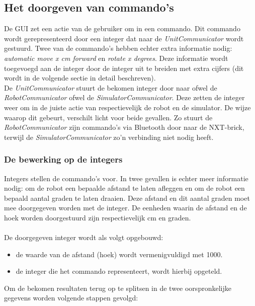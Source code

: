 \documentclass[tt3]{penoverslag}
\begin{document}
\subsection{Het doorgeven van commando's} %
\label{ssec:commands}
De GUI zet een actie van de gebruiker om in een commando. Dit commando wordt gerepresenteerd door een integer dat naar de \textit{UnitCommunicator} wordt gestuurd. Twee van de commando's hebben echter extra informatie nodig: \textit{automatic move x cm forward} en \textit{rotate x degrees}. Deze informatie wordt toegevoegd aan de integer door de integer uit te breiden met extra cijfers (dit wordt in de volgende sectie in detail beschreven).\\
De \textit{UnitCommunicator} stuurt de bekomen integer door naar ofwel de \textit{RobotCommunicator} ofwel de \textit{SimulatorCommunicator}. Deze zetten de integer weer om in de juiste actie van respectievelijk de robot en de simulator. De wijze waarop dit gebeurt, verschilt licht voor beide gevallen. Zo stuurt de \textit{RobotCommunicator} zijn commando's via Bluetooth door naar de NXT-brick, terwijl de \textit{SimulatorCommunicator} zo'n verbinding niet nodig heeft.\\

\subsubsection{De bewerking op de integers} %
\label{sssec:integer}
Integers stellen de commando's voor. In twee gevallen is echter meer informatie nodig: om de robot een bepaalde afstand te laten afleggen en om de robot een bepaald aantal graden te laten draaien. Deze afstand en dit aantal graden moet mee doorgegeven worden met de integer. De eenheden waarin de afstand en de hoek worden doorgestuurd zijn respectievelijk cm en graden.\\\\
De doorgegeven integer wordt als volgt opgebouwd:

\begin{itemize}
\item de waarde van de afstand (hoek) wordt vermenigvuldigd met 1000.
\item de integer die het commando representeert, wordt hierbij opgeteld.
\end{itemize}

Om de bekomen resultaten terug op te splitsen in de twee oorspronkelijke gegevens worden volgende stappen gevolgd:
\end{document}
